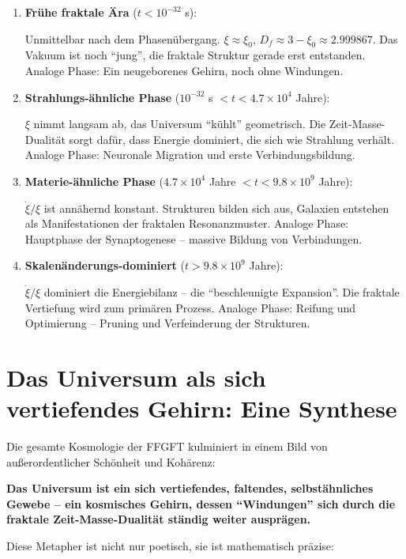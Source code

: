\documentclass[12pt,a4paper]{article}
\begin{document}
\begin{enumerate}[leftmargin=*]
\item \textbf{Frühe fraktale Ära} ($t < 10^{-32}$ s): 

Unmittelbar nach dem Phasenübergang. $\xi \approx \xi_0$, $D_f \approx 3 - \xi_0 \approx 2.999867$. Das Vakuum ist noch ``jung'', die fraktale Struktur gerade erst entstanden. Analoge Phase: Ein neugeborenes Gehirn, noch ohne Windungen.

\item \textbf{Strahlungs-ähnliche Phase} ($10^{-32}$ s $ < t < 4.7 \times 10^4$ Jahre):

$\xi$ nimmt langsam ab, das Universum ``kühlt'' geometrisch. Die Zeit-Masse-Dualität sorgt dafür, dass Energie dominiert, die sich wie Strahlung verhält. Analoge Phase: Neuronale Migration und erste Verbindungsbildung.

\item \textbf{Materie-ähnliche Phase} ($4.7 \times 10^4$ Jahre $ < t < 9.8 \times 10^9$ Jahre):

$\dot{\xi}/\xi$ ist annähernd konstant. Strukturen bilden sich aus, Galaxien entstehen als Manifestationen der fraktalen Resonanzmuster. Analoge Phase: Hauptphase der Synaptogenese -- massive Bildung von Verbindungen.

\item \textbf{Skalenänderungs-dominiert} ($t > 9.8 \times 10^9$ Jahre):

$\dot{\xi}/\xi$ dominiert die Energiebilanz -- die ``beschleunigte Expansion''. Die fraktale Vertiefung wird zum primären Prozess. Analoge Phase: Reifung und Optimierung -- Pruning und Verfeinderung der Strukturen.
\end{enumerate}

\section{Das Universum als sich vertiefendes Gehirn: Eine Synthese}

Die gesamte Kosmologie der FFGFT kulminiert in einem Bild von außerordentlicher Schönheit und Kohärenz:

\textbf{Das Universum ist ein sich vertiefendes, faltendes, selbstähnliches Gewebe -- ein kosmisches Gehirn, dessen ``Windungen'' sich durch die fraktale Zeit-Masse-Dualität ständig weiter ausprägen.}

Diese Metapher ist nicht nur poetisch, sie ist mathematisch präzise:
\end{document}
